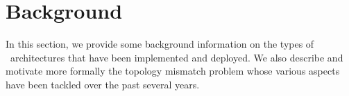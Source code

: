 \section{Background}
\label{section:background}


In this section, we provide some background information on the types of
\p\ architectures that have been implemented and deployed. We also
describe and motivate more formally the topology mismatch problem 
whose various aspects have been tackled over the past several years.

